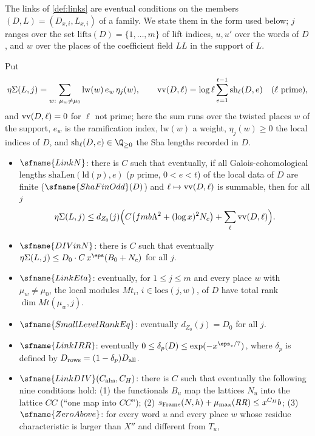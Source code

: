 The links of \cref{def:links} are eventual conditions on the members $(D,L)=(D_{x,i},L_{x,i})$ of a family. We
state them in the form used below; $j$ ranges over the set $\mathrm{lifts}(D)=\{1,\dots,m\}$ of lift indices,
$u,u'$ over the words of $D$, and $w$ over the places of the coefficient field $\mathit{LL}$ in the support of
$L$.

\begin{definition}[Links]\label{pf:top-shape:links}
Put
\[
\topshapeEta(L,j)=\sum_{w:\ \mu_w\ne\mu_0}\mathrm{lw}(w)\,e_w\,\eta_j(w),\qquad
\topshapeVV(D,\ell)=\log\ell\sum_{e=1}^{t-1}\mathrm{sh}_\ell(D,e)\quad(\ell\text{ prime}),
\]
and $\mathrm{vv}(D,\ell)=0$ for $\ell$ not prime; here the sum runs over the twisted places $w$ of the support,
$e_w$ is the ramification index, $\mathrm{lw}(w)$ a weight, $\eta_j(w)\ge0$ the local indices of $D$, and
$\mathrm{sh}_\ell(D,e)\in\Q_{\ge0}$ the Sha lengths recorded in $D$.
\begin{itemize}
\item $\sfname{LinkN}$: there is $C$ such that eventually, if all Galois-cohomological lengths
$\mathrm{shaLen}(\mathrm{ld}(p),e)$ ($p$ prime, $0<e<t$) of the local data of $D$ are finite
(\emph{$\sfname{ShaFinOdd}(D)$}) and $\ell\mapsto\mathrm{vv}(D,\ell)$ is summable, then for all $j$
\[
\eta\Sigma(L,j)\le d_{Z_0}(j)\Bigl(C\bigl(fmb\Lambda^2+(\log x)^2N_c\bigr)+\sum_\ell\mathrm{vv}(D,\ell)\Bigr).
\]
\item $\sfname{DIVinN}$: there is $C$ such that eventually $\topshapeEta(L,j)\le D_0\cdot C\,x^{\eps}(B_0+N_c)$
for all $j$.
\item $\sfname{LinkEta}$: eventually, for $1\le j\le m$ and every place $w$ with $\mu_w\ne\mu_0$, the local
modules $\mathit{Mt}_i$, $i\in\mathrm{locs}(j,w)$, of $D$ have total rank $\dim\mathit{Mt}(\mu_w,j)$.
\item $\sfname{SmallLevelRankEq}$: eventually $d_{Z_0}(j)=D_0$ for all $j$.
\item $\sfname{LinkIRR}$: eventually $0\le\delta_p(D)\le\exp(-x^{\eps_z/7})$, where $\delta_p$ is defined by
$D_{\rm rows}=(1-\delta_p)D_{\rm all}$.
\item $\sfname{LinkDIV}(C_{\rm abs},C_H)$: there is $C$ such that eventually the following nine conditions hold:
(1) the functionals $B_u$ map the lattices $N_u$ into the lattice $\mathit{CC}$ (``one map into
$\mathit{CC}$''); (2) $s_{\rm Frame}(N,h)+\mu_{\max}(\mathit{RR})\le x^{C_H}b$; (3) $\sfname{ZeroAbove}$: for
every word $u$ and every place $w$ whose residue characteristic is larger than $X''$ and different from $T_u$,

\end{itemize}
\end{definition}

